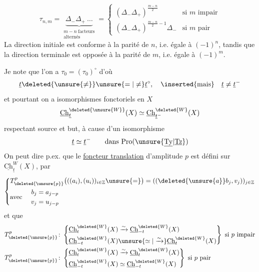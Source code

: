 \[
\tau_{n,m}=\underbrace{\Delta_-\Delta_+\ \ldots}_{\substack{m-n\ \text{facteurs}\\\text{alternés}}}
=\begin{cases}
(\Delta_-\Delta_+)^{\frac{m-n}{2}}&\text{si }m\text{ impair}\\
(\Delta_-\Delta_+)^{\frac{m-n}{2}-1}\Delta_-&\text{si }m\text{ pair}
\end{cases}
\]
La direction initiale est conforme à la parité
de $n$, i.e. égale à $(-1)^n$, tandis que la direction
 terminale est opposée à la parité de $m$, i.e. égale
à $(-1)^m$.

Je note  que l'on a $\tau_0=(\tau_0)^{\circ}$ d'où
\[
\underline t\deleted{\unsure{\ne}}\unsure{=|\ne}\underline t^{\circ},\quad\inserted{\text{mais}}\quad\underline t\ne\underline t^{-}
\]
et pourtant on a  isomorphismes fonctoriels
en $X$
\[
\underline{\mathrm{Ch}}^{\deleted{\unsure{W}}}_{\underline t}(X)\simeq
\underline{\mathrm{Ch}}^{\deleted{W}}_{\underline t^{-}}(X)
\]
respectant source et but, à cause d'un isomorphisme
\[
\underline t\simeq\underline t^{-}\qquad\text{dans }\mathrm{Pro}(\unsure{\underline{\mathrm{Ty}}|\underline{\mathrm{Tz}}})
\]
On peut dire p.ex. que le \uline{foncteur translation} 
d'amplitude $p$  est défini sur $\underline{\mathrm{Ch}}^{W}_{\underline t}(X)$, par
\[
\left\{\begin{aligned}
&T^{p}_{\deleted{\unsure{p}}}\bigl(((a_i),(u_i))_{i\in\mathbb Z}\unsure{=}\bigr)=((\deleted{\unsure{a}}b_j,v_j))_{j\in\mathbb Z}\\
&\text{avec }\quad\begin{aligned}b_j&=a_{j-p}\\v_j&=u_{j-p}\end{aligned}
\end{aligned}\right.
\]
et que
\[
\begin{aligned}
T^{p}_{\deleted{\unsure{p}}}\colon&
\left\{\begin{aligned}
\underline{\mathrm{Ch}}^{\deleted{W}}_{t}(X)&\xrightarrow{\sim}\underline{\mathrm{Ch}}^{\deleted{W}}_{-t}(X)\\
\underline{\mathrm{Ch}}^{\deleted{W}}_{-t}(X)&\unsure{\simeq|\xrightarrow{\sim}}\underline{\mathrm{Ch}}^{\deleted{W}}_{t}(X)
\end{aligned}\right\}\ \text{si }p\text{ impair}\\
T^{p}_{\deleted{\unsure{p}}}\colon&
\left\{\begin{aligned}
\underline{\mathrm{Ch}}^{\deleted{W}}_{t}(X)&\xrightarrow{\sim}\underline{\mathrm{Ch}}^{\deleted{W}}_{t}(X)\\
\underline{\mathrm{Ch}}^{\deleted{W}}_{-t}(X)&\simeq\underline{\mathrm{Ch}}^{\deleted{W}}_{-t}(X)
\end{aligned}\right\}\ \text{si }p\text{ pair}
\end{aligned}
\]
